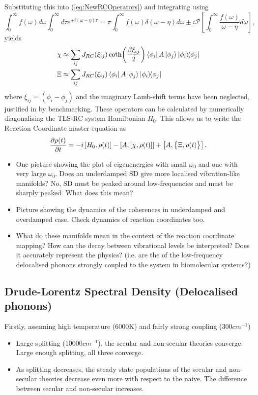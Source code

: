 \documentclass[]{article}
\begin{document}
Substituting this into (\ref{eq:NewRCOperators}) and integrating using 
\begin{equation}
	\label{eq:Sokhotski}
	\int_{0}^{\infty}f(\omega)d\omega\int_{0}^{\infty}d\tau e^{\pm i(\omega-\eta)\tau} = \pi\int_{0}^{\infty}f(\omega)\delta(\omega-\eta)d\omega \pm i \mathcal{P}\left[\int_{0}^{\infty}\frac{f(\omega)}{\omega-\eta}d\omega\right],
\end{equation}
yields
\begin{align}
	\label{eq:NewRCOperatorsDiscrete}
	\chi &\approx \sum_{ij}J_{RC}(\xi_{ij}) \coth(\frac{\beta \xi_{ij}}{2})\bra{\phi_i}A\ket{\phi_j}\dyad{\phi_i}{\phi_j}\\
	\Xi &\approx \sum_{ij}J_{RC}(\xi_{ij}) \bra{\phi_i}A\ket{\phi_j}\dyad{\phi_i}{\phi_j}
\end{align}
where $\xi_{ij} = (\phi_i-\phi_j)$ and the imaginary Lamb-shift terms have been neglected, justified in \cite{OriginalRCJakeAhsan} by benchmarking. These operators can be calculated by numerically diagonalising the TLS-RC system Hamiltonian $H_0$. This allows us to write the Reaction Coordinate master equation as
\begin{equation}
\pdv{\rho(t)}{t} = -i\left[H_0, \rho(t)\right] - \left[A, \left[\chi, \rho(t)\right]\right] + \left[A, \big\lbrace\Xi, \rho(t)\big\rbrace\right].
\end{equation}
\begin{itemize}
	\item One picture showing the plot of eigenenergies with small $\omega_0$ and one with very large $\omega_0$. Does an underdamped SD give more localised vibration-like manifolds?  No, SD must be peaked around low-frequencies and  must be sharply peaked. What does this mean?
	\item Picture showing the dynamics of the coherences in underdamped and overdamped case. Check dynamics of reaction coordinates too.
	\item What do these manifolds mean in the context of the reaction coordinate mapping? How can the decay between vibrational levels be interpreted? Does it accurately represent the physics? (i.e. are the of the low-frequency delocalised phonons strongly coupled to the system in biomolecular systems?)
\end{itemize}

\subsection{Drude-Lorentz Spectral Density (Delocalised phonons)}
Firstly, assuming high temperature (6000K) and fairly strong coupling (300$cm^{-1}$)
\begin{itemize}
	\item Large splitting (10000$cm^{-1}$), the secular and non-secular theories converge. Large enough splitting, all three converge.
	\item As splitting decreases, the steady state populations of the secular and non-secular theories decrease even more with respect to the naive. The difference between secular and non-secular increases.
\end{itemize}
\end{document}
